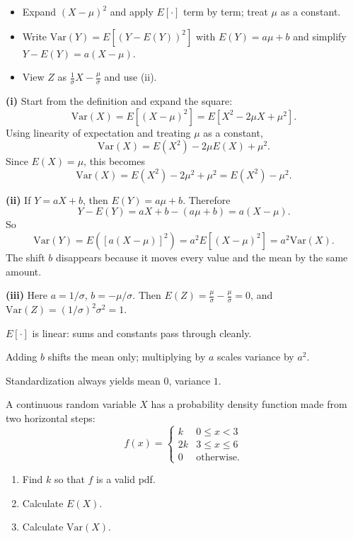 \begin{hint}
\begin{itemize}[leftmargin=*]
  \item Expand $(X-\mu)^2$ and apply $E[\cdot]$ term by term; treat $\mu$ as a constant.
  \item Write $\mathrm{Var}(Y)=E[(Y-E(Y))^2]$ with $E(Y)=a\mu+b$ and simplify $Y-E(Y)=a(X-\mu)$.
  \item View $Z$ as $\frac{1}{\sigma}X-\frac{\mu}{\sigma}$ and use (ii).
\end{itemize}
\end{hint}

\begin{solution}
\textbf{(i)} Start from the definition and expand the square:
\[
\mathrm{Var}(X)=E[(X-\mu)^2]=E[X^2-2\mu X+\mu^2].
\]
Using linearity of expectation and treating $\mu$ as a constant,
\[
\mathrm{Var}(X)=E(X^2)-2\mu E(X)+\mu^2.
\]
Since $E(X)=\mu$, this becomes
\[
\mathrm{Var}(X)=E(X^2)-2\mu^2+\mu^2=E(X^2)-\mu^2.
\]

\textbf{(ii)} If $Y=aX+b$, then $E(Y)=a\mu+b$. Therefore
\[
Y-E(Y)=aX+b-(a\mu+b)=a(X-\mu).
\]
So
\[
\mathrm{Var}(Y)=E([a(X-\mu)]^2)=a^2E[(X-\mu)^2]=a^2\mathrm{Var}(X).
\]
The shift $b$ disappears because it moves every value and the mean by the same amount.

\textbf{(iii)} Here $a=1/\sigma$, $b=-\mu/\sigma$. Then $E(Z)=\frac{\mu}{\sigma}-\frac{\mu}{\sigma}=0$, and $\mathrm{Var}(Z)=(1/\sigma)^2\sigma^2=1$.
\end{solution}

\begin{takeaways}
\item $E[\cdot]$ is linear: sums and constants pass through cleanly.
\item Adding $b$ shifts the mean only; multiplying by $a$ scales variance by $a^2$.
\item Standardization always yields mean $0$, variance $1$.
\end{takeaways}

\begin{problem}
A continuous random variable $X$ has a probability density function made from two horizontal steps:
\[
f(x)=\begin{cases}
k & 0\le x<3\\
2k & 3\le x\le 6\\
0 & \text{otherwise.}
\end{cases}
\]
\begin{enumerate}[label=\textbf{(\roman*)}]
  \item Find $k$ so that $f$ is a valid pdf.
  \item Calculate $E(X)$.
  \item Calculate $\mathrm{Var}(X)$.
\end{enumerate}


\end{problem}

